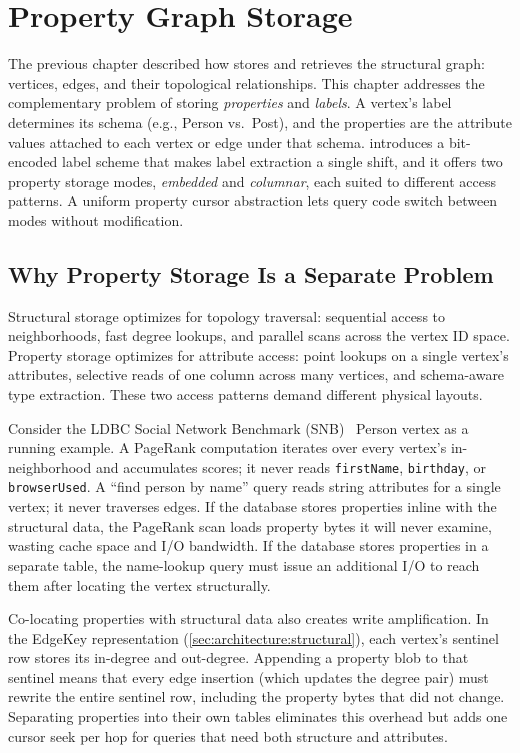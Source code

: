 \chapter{Property Graph Storage}
\label{sec:architecture:property}

The previous chapter described how \project{} stores and retrieves the structural graph: vertices, edges, and their topological relationships.
This chapter addresses the complementary problem of storing \emph{properties} and \emph{labels}.
A vertex's label determines its schema (e.g., Person vs.\ Post), and the properties are the attribute values attached to each vertex or edge under that schema.
\project{} introduces a bit-encoded label scheme that makes label extraction a single shift, and it offers two property storage modes, \emph{embedded} and \emph{columnar}, each suited to different access patterns.
A uniform property cursor abstraction lets query code switch between modes without modification.

\section{Why Property Storage Is a Separate Problem}
\label{arch:prop-motivation}

Structural storage optimizes for topology traversal: sequential access to neighborhoods, fast degree lookups, and parallel scans across the vertex ID space.
Property storage optimizes for attribute access: point lookups on a single vertex's attributes, selective reads of one column across many vertices, and schema-aware type extraction.
These two access patterns demand different physical layouts.

Consider the LDBC Social Network Benchmark (SNB)~\cite{erling2015ldbc} Person vertex as a running example.
A PageRank computation iterates over every vertex's in-neighborhood and accumulates scores; it never reads \texttt{firstName}, \texttt{birthday}, or \texttt{browserUsed}.
A ``find person by name'' query reads string attributes for a single vertex; it never traverses edges.
If the database stores properties inline with the structural data, the PageRank scan loads property bytes it will never examine, wasting cache space and I/O bandwidth.
If the database stores properties in a separate table, the name-lookup query must issue an additional I/O to reach them after locating the vertex structurally.

Co-locating properties with structural data also creates write amplification.
In the EdgeKey representation (\autoref{sec:architecture:structural}), each vertex's sentinel row stores its in-degree and out-degree.
Appending a property blob to that sentinel means that every edge insertion (which updates the degree pair) must rewrite the entire sentinel row, including the property bytes that did not change.
Separating properties into their own tables eliminates this overhead but adds one cursor seek per hop for queries that need both structure and attributes.

